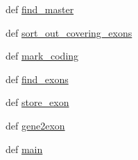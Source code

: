 \begin{DoxyCompactItemize}
\item 
def \hyperlink{namespace07__gene2exon__store_a665bada4a28288a2e9b58b9ad716038d}{find\-\_\-master}
\item 
def \hyperlink{namespace07__gene2exon__store_abef7545d48b188af301e1e3aad262f65}{sort\-\_\-out\-\_\-covering\-\_\-exons}
\item 
def \hyperlink{namespace07__gene2exon__store_a66cb13a35ee4ce4dfd95f21dc25100a3}{mark\-\_\-coding}
\item 
def \hyperlink{namespace07__gene2exon__store_ac0a8c79ad7569751b62dfbcbe0eb1ebe}{find\-\_\-exons}
\item 
def \hyperlink{namespace07__gene2exon__store_a5a28d4838cfec05666fca45181fc5023}{store\-\_\-exon}
\item 
def \hyperlink{namespace07__gene2exon__store_a39856180ccd889d3c32353aaa22ff487}{gene2exon}
\item 
def \hyperlink{namespace07__gene2exon__store_af9760b62000911a1b31ca9a35f8d6495}{main}
\end{DoxyCompactItemize}


